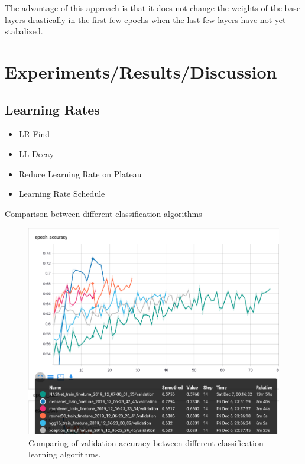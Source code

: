 \documentclass{article}
\begin{document}
The advantage of this approach is that it does not change the weights of the base layers drastically in the first few epochs when the last few layers have not yet stabalized. 

\section{Experiments/Results/Discussion}

\subsection{Learning Rates}

\begin{itemize}
    \item LR-Find
    \item LL Decay
    \item Reduce Learning Rate on Plateau
    \item Learning Rate Schedule
    
\end{itemize}

Comparison between different classification algorithms

\begin{figure}
    \centering
    \includegraphics[width=\linewidth]{data/images/Section_5_Comparision/Classification_plot.png}
    \caption{Comparing of validation accuracy between different classification learning algorithms. \cite{Zoph_2018}  \cite{Huang_2017} \cite{howard2017mobilenets} \cite{he2016deep} \cite{simonyan2014deep} \cite{chollet2017xception} }
    \label{fig:my_label}
\end{figure}
\end{document}
